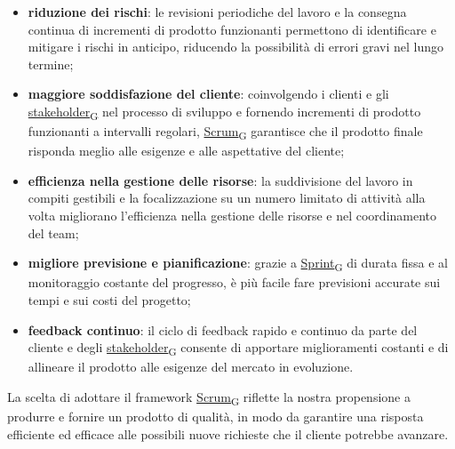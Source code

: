 \begin{itemize}
	\item \textbf{riduzione dei rischi}: le revisioni periodiche del lavoro e la consegna continua di incrementi di prodotto funzionanti permettono di identificare e mitigare i rischi in anticipo, riducendo la possibilità di errori gravi nel lungo termine;
	\item \textbf{maggiore soddisfazione del cliente}: coinvolgendo i clienti e gli \href{https://7last.github.io/docs/rtb/documentazione-interna/glossario\#stakeholder}{stakeholder\textsubscript{G}} nel processo di sviluppo e fornendo incrementi di prodotto funzionanti a intervalli regolari, \href{https://7last.github.io/docs/rtb/documentazione-interna/glossario\#scrum}{Scrum\textsubscript{G}} garantisce che il prodotto finale risponda meglio alle esigenze e alle aspettative del cliente;
	\item \textbf{efficienza nella gestione delle risorse}: la suddivisione del lavoro in compiti gestibili e la focalizzazione su un numero limitato di attività alla volta migliorano l’efficienza nella gestione delle risorse e nel coordinamento del team;
	\item \textbf{migliore previsione e pianificazione}: grazie a \href{https://7last.github.io/docs/rtb/documentazione-interna/glossario\#sprint}{Sprint\textsubscript{G}} di durata fissa e al monitoraggio costante del progresso, è più facile fare previsioni accurate sui tempi e sui costi del progetto;
	\item \textbf{feedback continuo}: il ciclo di feedback rapido e continuo da parte del cliente e degli \href{https://7last.github.io/docs/rtb/documentazione-interna/glossario\#stakeholder}{stakeholder\textsubscript{G}} consente di apportare miglioramenti costanti e di allineare il prodotto alle esigenze del mercato in evoluzione.
\end{itemize}
La scelta di adottare il framework \href{https://7last.github.io/docs/rtb/documentazione-interna/glossario\#scrum}{Scrum\textsubscript{G}} riflette la nostra propensione a produrre e fornire un prodotto di qualità, in modo da garantire una risposta efficiente ed efficace alle possibili nuove richieste che il cliente potrebbe avanzare.

